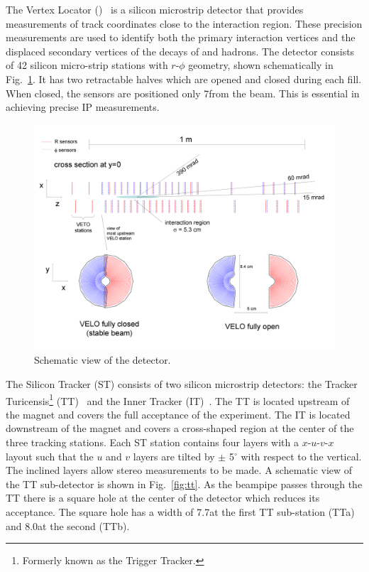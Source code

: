The Vertex Locator (\velo)~\cite{LHCb-TDR-005,LHCb-DP-2014-001} is a silicon microstrip detector that provides measurements of track coordinates close to the \proton\proton interaction region. These precision measurements are used to identify both the primary interaction vertices and the displaced secondary vertices of the decays of \bquark and \cquark hadrons. The detector consists of 42 silicon micro-strip stations with $r$-$\phi$ geometry, shown schematically in Fig.~\ref{fig:velo}. It has two retractable halves which are opened and closed during each \lhc fill. When closed, the sensors are positioned only 7\mm from the \lhc beam. This is essential in achieving precise IP measurements.

\begin{figure}[!tb]
\centering
\includegraphics[width=\textwidth]{figs/detector/velo.png}
\caption{Schematic view of the \velo detector.}
\label{fig:velo}
\end{figure}

The Silicon Tracker (ST) consists of two silicon microstrip detectors: the Tracker Turicensis\footnote{Formerly known as the Trigger Tracker.} (TT)~\cite{LHCb-TDR-009} and the Inner Tracker (IT)~\cite{LHCb-TDR-008}. The TT is located upstream of the magnet and covers the full acceptance of the experiment. The IT is located downstream of the magnet and covers a cross-shaped region at the center of the three tracking stations. Each ST station contains four layers with a \mbox{$x$-$u$-$v$-$x$} layout such that the $u$ and $v$ layers are tilted by $\pm$ 5$^{\circ}$ with respect to the vertical. The inclined layers allow stereo measurements to be made. A schematic view of the TT sub-detector is shown in Fig.~\ref{fig:tt}. As the beampipe passes through the TT there is a square hole at the center of the detector which reduces its acceptance. The square hole has a width of 7.7\cm at the first TT sub-station (TTa) and 8.0\cm at the second (TTb).


